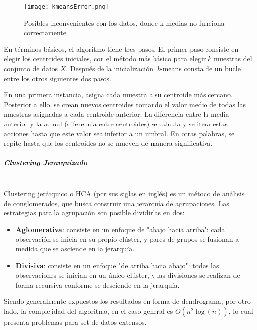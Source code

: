 \begin{figure}[!h]
	
	\centering
	\texttt{[image: kmeansError.png]}
	\caption{Posibles inconvenientes con los datos, donde k-medias  no funciona correctamente}
	\label{kerror}
\end{figure}


En términos básicos, el algoritmo tiene tres pasos. El primer paso consiste en elegir los centroides iniciales, con el método más básico para elegir $k$ muestras del conjunto de datos $X$. Después de la inicialización, \textit{k}-means  consta de un bucle entre los otros siguientes dos pasos. 

En una primera instancia, asigna cada muestra a su centroide más cercano. Posterior a ello, se crean nuevos centroides tomando el valor medio de todas las muestras asignadas a cada centroide anterior. La diferencia entre la media anterior y la actual (diferencia entre centroides) se calcula y se itera estas acciones hasta que este valor sea inferior a un umbral. En otras palabras, se repite hasta que los centroides no se mueven de manera significativa.

\subparagraph{Clustering Jerarquizado\\\\}

Clustering jerárquico o HCA (por sus siglas en inglés) es un método de análisis de conglomerados, que busca construir una jerarquía de agrupaciones. Las estrategias para la agrupación son posible dividirlas en dos:

\begin{itemize}
	
	\item \textbf{Aglomerativa}: consiste en un enfoque de "abajo hacia arriba": cada observación se inicia en su propio clúster, y pares de grupos se fusionan a medida que se asciende en la jerarquía. 
	
	\item \textbf{Divisiva}: consiste en un enfoque "de arriba hacia abajo": todas las observaciones se inician en un único clúster, y las divisiones se realizan de forma recursiva conforme se desciende en la jerarquía.
	
\end{itemize}

Siendo generalmente expuestos los resultados en forma de dendrograma, por otro lado, la complejidad del algoritmo, en el caso general es $\displaystyle O(n^{2}\log(n))$, lo cual presenta problemas para set de datos extensos.

